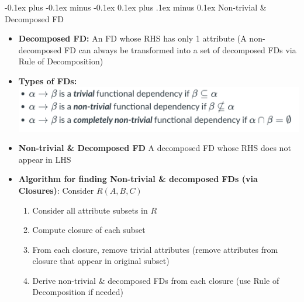\documentclass[landscape]{article}
\makeatletter
\renewcommand{\subsection}{\@startsection{subsection}{2}{0mm}%
  {-0.1ex plus -0.1ex minus -0.1ex}%
  {0.1ex plus .1ex minus 0.1ex}%
{\normalfont\scriptsize\bfseries}}
\makeatother
\begin{document}
\begin{multicols*}{5}
    \subsection{Non-trivial \& Decomposed FD}
    \begin{itemize}
      \item \textbf{Decomposed FD:} An FD whose RHS has only 1 attribute (A non-decomposed FD can always be transformed into a set of decomposed FDs via Rule of Decomposition)
      \item \textbf{Types of FDs:}
      \includegraphics[width=0.9\linewidth]{27_fd.png}
      \item \textbf{Non-trivial \& Decomposed FD} A decomposed FD whose RHS does not appear in LHS
      \item \textbf{Algorithm for finding Non-trivial \& decomposed FDs (via Closures)}: Consider $R(A,B,C)$
      \begin{enumerate}
        \item Consider all attribute subsets in $R$
        \item Compute closure of each subset
        \item From each closure, remove trivial attributes (remove attributes from closure that appear in original subset)
        \item Derive non-trivial \& decomposed FDs from each closure (use Rule of Decomposition if needed)
      \end{enumerate}
    \end{itemize}


\end{multicols*}
\end{document}
